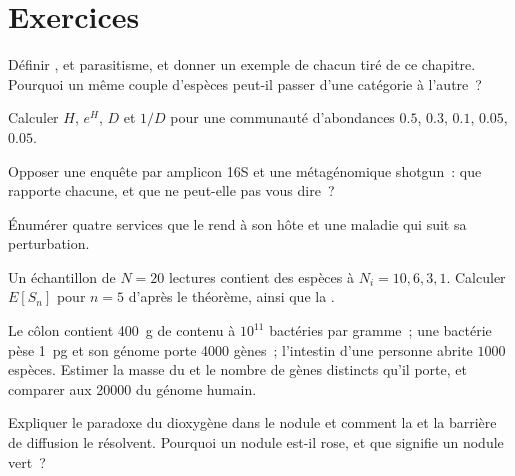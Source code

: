 \section{Exercices}

\begin{exercise}[$\star$]\label{exo:b3:microbiomes:1}
Définir ,  et parasitisme, et donner un exemple
de chacun tiré de ce chapitre. Pourquoi un même couple d'espèces
peut-il passer d'une catégorie à l'autre~?
\end{exercise}

\begin{exercise}[$\star$]\label{exo:b3:microbiomes:2}
Calculer $H$, $e^{H}$, $D$ et $1/D$ pour une communauté d'abondances
$0.5$, $0.3$, $0.1$, $0.05$, $0.05$.
\end{exercise}

\begin{exercise}[$\star$]\label{exo:b3:microbiomes:3}
Opposer une enquête par amplicon 16S et une métagénomique shotgun~: que
rapporte chacune, et que ne peut-elle pas vous dire~?
\end{exercise}

\begin{exercise}[$\star$]\label{exo:b3:microbiomes:4}
Énumérer quatre services que le  rend à son hôte
et une maladie qui suit sa perturbation.
\end{exercise}

\begin{exercise}[$\star\star$]\label{exo:b3:microbiomes:5}
Un échantillon de $N = 20$ lectures contient des espèces à
$N_{i} = 10, 6, 3, 1$. Calculer $E[S_{n}]$ pour $n = 5$ d'après le
théorème, ainsi que la .
\end{exercise}

\begin{exercise}[$\star\star$]\label{exo:b3:microbiomes:6}
Le côlon contient \qty{400}{g} de contenu à $10^{11}$ bactéries par
gramme~; une bactérie pèse \qty{1}{pg} et son génome porte \num{4000}
gènes~; l'intestin d'une personne abrite $1000$ espèces. Estimer la
masse du  et le nombre de gènes distincts qu'il porte, et
comparer aux \num{20000} du génome humain.
\end{exercise}

\begin{exercise}[$\star\star$]\label{exo:b3:microbiomes:7}
Expliquer le paradoxe du dioxygène dans le nodule et comment la
 et la barrière de diffusion le résolvent. Pourquoi un
nodule est-il rose, et que signifie un nodule vert~?
\end{exercise}

